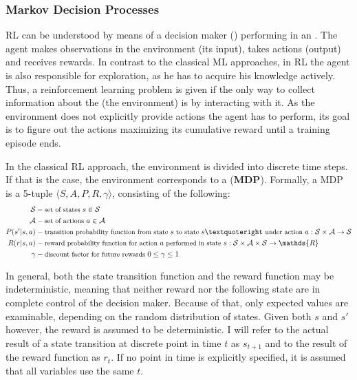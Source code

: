 \subsubsection{Markov Decision Processes} \label{ch:mdps}

RL can be understood by means of a decision maker () performing in an . The agent makes observations in the environment (its input), takes actions (output) and receives rewards. In contrast to the classical ML approaches, in RL the agent is also responsible for exploration, as he has to acquire his knowledge actively. Thus, a reinforcement learning problem is given if the only way to collect information about the  (the environment) is by interacting with it. As the environment does not explicitly provide actions the agent has to perform, its goal is to figure out the actions maximizing its cumulative reward until a training episode ends.

In the classical RL approach, the environment is divided into discrete time steps. If that is the case, the environment corresponds to a  (\textbf{MDP}). Formally, a MDP is a 5-tuple $\langle S, A, P, R, \gamma \rangle$, consisting of the following:\\
\begin{align*}
\mathcal{S} &- \text{\small set of states } s\in \mathcal{S}\\
\mathcal{A} &- \text{\small set of actions } a \in \mathcal{A}\\
P(s'|s, a) &- \text{\small transition probability function from state } s \text{\small ~to state } s’ \text{\small ~under action } a: \mathcal{S} \times \mathcal{A} \rightarrow \mathcal{S} \\
R(r|s, a) &- \text{\small reward probability function for action } a \text{\small ~performed in state } s: \mathcal{S} \times \mathcal{A} \times \mathcal{S} \rightarrow \mathds{R} \\
\gamma &- \text{\small discount factor for future rewards } 0 \leq \gamma \leq 1
\end{align*}

In general, both the state transition function and the reward function may be indeterministic, meaning that neither reward nor the following state are in complete control of the decision maker. Because of that, only expected values are examinable, depending on the random distribution of states. Given both $s$ and $s'$ however, the reward is assumed to be deterministic. I will refer to the actual result of a state transition at discrete point in time $t$ as $s_{t+1}$ and to the result of the reward function as $r_t$. If no point in time is explicitly specified, it is assumed that all variables use the same $t$.\\

